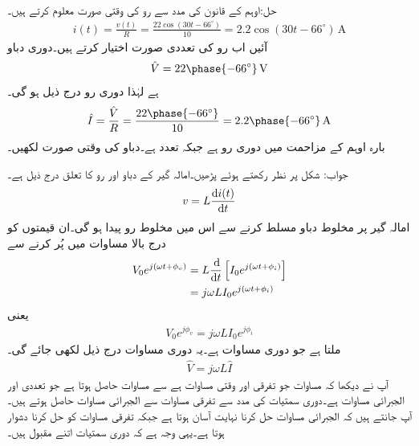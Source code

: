 حل:اوہم کے قانون کی مدد سے رو کی وقتی صورت معلوم کرتے ہیں۔
\begin{align*}
i(t)=\frac{v(t)}{R}=\frac{22\cos(30t-66^{\circ})}{10}=2.2\cos(30t-66^{\circ}) \, \si{\ampere}
\end{align*}
آئیں اب رو کی تعددی صورت اختیار کرتے ہیں۔دوری دباو
\begin{align*}
\hat{V}=22\phase{-66^{\circ}}\, \si{\volt}
\end{align*}
ہے لہٰذا دوری رو درج ذیل ہو گی۔
\begin{align*}
\hat{I}=\frac{\hat{V}}{R}=\frac{22\phase{-66^{\circ}}}{10}=2.2\phase{-66^{\circ}} \, \si{\ampere}
\end{align*}
بارہ اوہم کے مزاحمت میں دوری رو  ہے جبکہ تعدد  ہے۔دباو کی وقتی صورت لکھیں۔

جواب:
شکل  پر نظر رکھتے ہوئے پڑھیں۔امالہ گیر کے دباو اور رو کا تعلق درج ذیل ہے۔
\begin{align}\label{مساوات_بدلتا_امالہ_وقتی_تعلق}
v=L\frac{\dif i(t)}{\dif t}
\end{align}
امالہ گیر پر مخلوط دباو  مسلط کرنے سے اس میں مخلوط رو  پیدا ہو گی۔ان قیمتوں کو درج بالا مساوات میں پُر کرنے سے
\begin{align*}
V_0 e^{j(\omega t+\phi_v)}&=L \frac{\dif}{\dif t} \left[I_0 e^{j(\omega t +\phi_i)}\right]\\
&=j \omega L I_0 e^{j(\omega t+\phi_i)}
\end{align*}
یعنی
\begin{align*}
V_0 e^{j\phi_v}=j\omega L I_0 e^{j\phi_i}
\end{align*}
ملتا ہے جو دوری مساوات ہے۔یہ دوری مساوات درج ذیل لکھی جائے گی۔
\begin{align}\label{مساوات_بدلتا_امالہ_تعددی_تعلق_الف}
\hat{V}=j\omega L \hat{I}
\end{align} 
آپ نے دیکھا کہ مساوات  جو تفرقی اور وقتی مساوات ہے سے مساوات  حاصل ہوتا ہے جو تعددی اور الجبرائی مساوات ہے۔دوری سمتیات کی مدد سے تفرقی مساوات سے الجبرائی مساوات حاصل ہوتے ہیں۔آپ جانتے ہیں کہ الجبرائی مساوات حل کرنا نہایت آسان ہوتا ہے جبکہ تفرقی مساوات کو حل کرنا دشوار ہوتا ہے۔یہی وجہ ہے کہ دوری سمتیات اتنے مقبول ہیں۔

